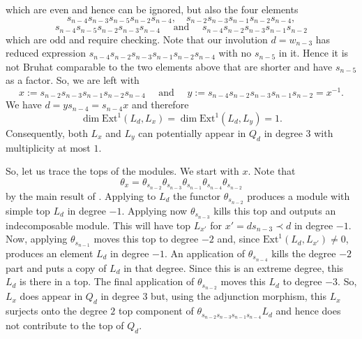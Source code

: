 \documentclass[a4paper]{amsart}
\begin{document}
which are even and hence can be ignored, but also the four elements
\begin{displaymath}
s_{n-4}s_{n-3}s_{n-5}s_{n-2}s_{n-4},\quad
s_{n-2}s_{n-3}s_{n-1}s_{n-2}s_{n-4},
\end{displaymath}
\begin{displaymath}
s_{n-4}s_{n-5}s_{n-2}s_{n-3}s_{n-4}\quad\text{ and }\quad
s_{n-4}s_{n-2}s_{n-3}s_{n-1}s_{n-2}
\end{displaymath}
which are odd and require checking.
Note that our involution $d=w_{n-3}$
has reduced expression $s_{n-4}s_{n-2}s_{n-3}s_{n-1}s_{n-2}s_{n-4}$
with  no $s_{n-5}$ in it. Hence it is not Bruhat
comparable to the two elements above that are shorter and have
$s_{n-5}$ as a factor. So, we are left with
\begin{displaymath}
x:=s_{n-2}s_{n-3}s_{n-1}s_{n-2}s_{n-4}
\quad\text{ and }\quad
y:=s_{n-4}s_{n-2}s_{n-3}s_{n-1}s_{n-2}=x^{-1}.
\end{displaymath}
We have $d=ys_{n-4}=s_{n-4}x$ and therefore
\begin{displaymath}
\dim\mathrm{Ext}^1(L_d,L_x)=\dim\mathrm{Ext}^1(L_d,L_y)=1.
\end{displaymath}
Consequently, both $L_x$ and $L_y$ can potentially 
appear in $Q_d$ in degree $3$ with multiplicity at most $1$.

So, let us trace the tops of the modules. We start with $x$.
Note that 
\begin{displaymath}
\theta_x=\theta_{s_{n-2}}\theta_{s_{n-3}}
\theta_{s_{n-1}}\theta_{s_{n-4}}\theta_{s_{n-2}}
\end{displaymath}
by the main result of \cite{BW}.
Applying to $L_d$ the functor $\theta_{s_{n-2}}$ produces a module
with simple top $L_d$ in degree $-1$. Applying now $\theta_{s_{n-3}}$
kills this top and outputs an indecomposable module. This will have top
$L_{x'}$ for $x'=ds_{n-3}\prec d$ in degree $-1$. Now, applying
$\theta_{s_{n-1}}$ moves this top to degree $-2$ and, since 
$\mathrm{Ext}^1(L_d,L_{x'})\neq 0$, produces an element
$L_d$ in degree $-1$. An application of $\theta_{s_{n-4}}$
kills the degree $-2$ part and puts a copy of $L_d$ in that degree.
Since this is an extreme degree, this $L_d$ is there in a top.
The final application of $\theta_{s_{n-2}}$ moves this $L_d$
to degree $-3$. So, $L_x$ does appear in $Q_d$ in degree $3$
but, using the adjunction morphism, this $L_x$ surjects onto
the degree $2$ top component of
$\theta_{s_{n-2}s_{n-3}s_{n-1}s_{n-4}}L_d$ and hence does not
contribute to the top of $Q_d$.
\end{document}
